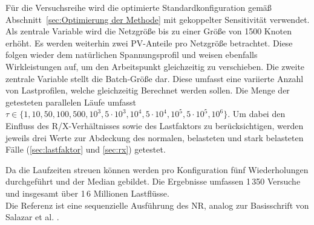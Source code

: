 %


Für die Versuchsreihe wird die optimierte Standardkonfiguration gemäß Abschnitt~\ref{sec:Optimierung der Methode} mit gekoppelter Sensitivität verwendet.
Als zentrale Variable wird die Netzgröße bis zu einer Größe von 1500 Knoten erhöht.
Es werden weiterhin zwei PV-Anteile pro Netzgröße betrachtet.
Diese folgen wieder dem natürlichen Spannungsprofil und weisen ebenfalls Wirkleistungen auf, um den Arbeitspunkt gleichzeitig zu verschieben.
Die zweite zentrale Variable stellt die Batch-Größe dar.
Diese umfasst eine variierte Anzahl von Lastprofilen, welche gleichzeitig Berechnet werden sollen.
Die Menge der getesteten parallelen Läufe umfasst $\tau\in\{1,10,50,100,500,10^3,5\cdot10^3,10^4,5\cdot10^4,10^5, 5\cdot10^5, 10^6\}$.
Um dabei den Einfluss des R/X-Verhältnisses sowie des Lastfaktors zu berücksichtigen, werden jeweils drei Werte  zur Abdeckung des normalen, belasteten und stark belasteten Fälle (\cref{sec:lastfaktor} und \ref{sec:rx}) getestet. 

Da die Laufzeiten streuen können werden pro Konfiguration fünf Wiederholungen durchgeführt und der Median gebildet.
Die Ergebnisse umfassen 1\,350 Versuche und insgesamt über 1\,6 Millionen Lastflüsse.\\

Die Referenz ist eine sequenzielle Ausführung des NR, analog zur Basisschrift von Salazar et al. \cite{Salazar2024}.
 

